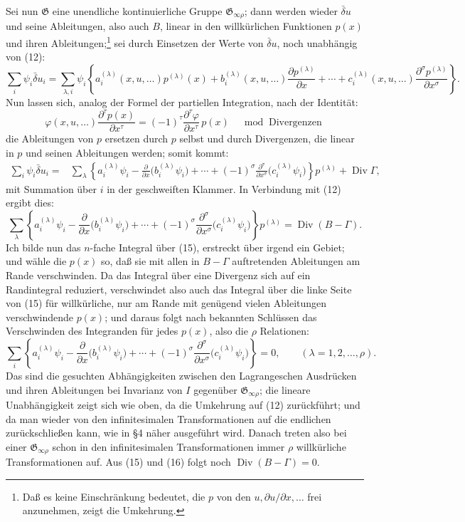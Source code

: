 \documentclass[11pt]{article}
\newcommand{\Div}{\operatorname{Div}}
\newcommand{\G}{\mathfrak G}
\newcommand{\bd}{\bar{\delta}}
\newcommand{\p}{\partial}
\begin{document}
Sei nun \(\G\) eine unendliche kontinuierliche Gruppe \(\G_{\infty\rho}\); dann werden wieder \(\bd u\) und seine Ableitungen, also auch \(B\), linear in den willkürlichen Funktionen \(p(x)\) und ihren Ableitungen;\footnote{Daß es keine Einschränkung bedeutet, die \(p\) von den \(u,\p u/\p x,\ldots\) frei anzunehmen, zeigt die Umkehrung.} sei durch Einsetzen der Werte von \(\bd u\), noch unabhängig von (12):
\[
\sum_i\psi_i\bd u_i
=\sum_{\lambda,i}\psi_i\left\{
a_i^{(\lambda)}(x,u,\ldots)p^{(\lambda)}(x)
+b_i^{(\lambda)}(x,u,\ldots)\frac{\p p^{(\lambda)}}{\p x}
+\cdots+c_i^{(\lambda)}(x,u,\ldots)
\frac{\p^\sigma p^{(\lambda)}}{\p x^\sigma}\right\}.
\]
Nun lassen sich, analog der Formel der partiellen Integration, nach der Identität:
\[
\varphi(x,u,\ldots)\frac{\p^\tau p(x)}{\p x^\tau}
=(-1)^\tau\frac{\p^\tau\varphi}{\p x^\tau}\,p(x)
\quad \bmod \text{ Divergenzen}
\]
die Ableitungen von \(p\) ersetzen durch \(p\) selbst und durch Divergenzen, die linear in \(p\) und seinen Ableitungen werden; somit kommt:
\begin{equation}
\begin{aligned}
\sum_i\psi_i\bd u_i
={}&\sum_\lambda\left\{
a_i^{(\lambda)}\psi_i-\frac{\p}{\p x}\bigl(b_i^{(\lambda)}\psi_i\bigr)
+\cdots+(-1)^\sigma
\frac{\p^\sigma}{\p x^\sigma}\bigl(c_i^{(\lambda)}\psi_i\bigr)
\right\}p^{(\lambda)}+\Div\Gamma,
\end{aligned}
\tag{14}
\end{equation}
mit Summation über \(i\) in der geschweiften Klammer. In Verbindung mit (12) ergibt dies:
\begin{equation}
\sum_\lambda\left\{
a_i^{(\lambda)}\psi_i-\frac{\p}{\p x}\bigl(b_i^{(\lambda)}\psi_i\bigr)
+\cdots+(-1)^\sigma
\frac{\p^\sigma}{\p x^\sigma}\bigl(c_i^{(\lambda)}\psi_i\bigr)
\right\}p^{(\lambda)}
=\Div(B-\Gamma).
\tag{15}
\end{equation}
Ich bilde nun das \(n\)-fache Integral über (15), erstreckt über irgend ein Gebiet; und wähle die \(p(x)\) so, daß sie mit allen in \(B-\Gamma\) auftretenden Ableitungen am Rande verschwinden. Da das Integral über eine Divergenz sich auf ein Randintegral reduziert, verschwindet also auch das Integral über die linke Seite von (15) für willkürliche, nur am Rande mit genügend vielen Ableitungen verschwindende \(p(x)\); und daraus folgt nach bekannten Schlüssen das Verschwinden des Integranden für jedes \(p(x)\), also die \(\rho\) Relationen:
\begin{equation}
\sum_i\left\{
a_i^{(\lambda)}\psi_i-\frac{\p}{\p x}\bigl(b_i^{(\lambda)}\psi_i\bigr)
+\cdots+(-1)^\sigma
\frac{\p^\sigma}{\p x^\sigma}\bigl(c_i^{(\lambda)}\psi_i\bigr)
\right\}=0,\qquad(\lambda=1,2,\ldots,\rho).
\tag{16}
\end{equation}
Das sind die gesuchten Abhängigkeiten zwischen den Lagrangeschen Ausdrücken und ihren Ableitungen bei Invarianz von \(I\) gegenüber \(\G_{\infty\rho}\); die lineare Unabhängigkeit zeigt sich wie oben, da die Umkehrung auf (12) zurückführt; und da man wieder von den infinitesimalen Transformationen auf die endlichen zurückschließen kann, wie in \S{}4 näher ausgeführt wird. Danach treten also bei einer \(\G_{\infty\rho}\) schon in den infinitesimalen Transformationen immer \(\rho\) willkürliche Transformationen auf. Aus (15) und (16) folgt noch \(\Div(B-\Gamma)=0\).
\end{document}
